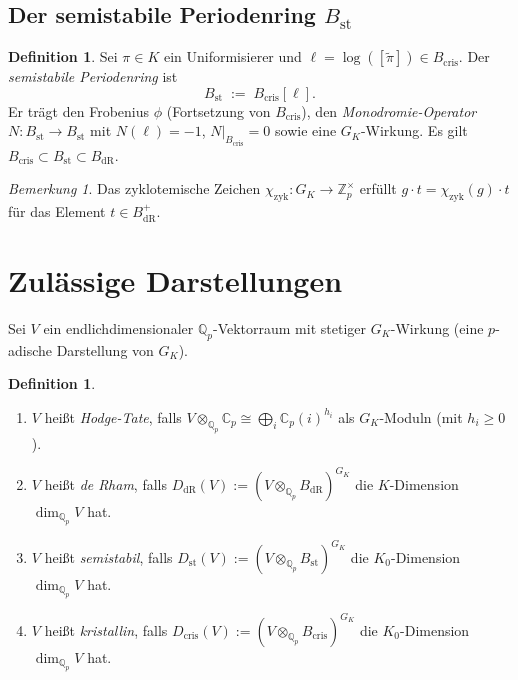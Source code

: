 \documentclass[12pt,a4paper]{amsart}
\theoremstyle{definition}
\newtheorem{definition_de}[theorem]{Definition}
\theoremstyle{remark}
\newtheorem{bemerkung}[theorem]{Bemerkung}
\newcommand{\Qp}{\mathbb{Q}_p}
\newcommand{\Zp}{\mathbb{Z}_p}
\newcommand{\BdR}{B_{\mathrm{dR}}}
\newcommand{\Bcris}{B_{\mathrm{cris}}}
\newcommand{\Bst}{B_{\mathrm{st}}}
\newcommand{\DdR}{D_{\mathrm{dR}}}
\newcommand{\Dcris}{D_{\mathrm{cris}}}
\newcommand{\Dst}{D_{\mathrm{st}}}
\begin{document}
\subsection{Der semistabile Periodenring $\Bst$}

\begin{definition_de}
  Sei $\pi \in K$ ein Uniformisierer und $\ell = \log([\widetilde{\pi}]) \in \Bcris$.
  Der \emph{semistabile Periodenring} ist
  \[
    \Bst \;:=\; \Bcris[\ell].
  \]
  Er trägt den Frobenius $\phi$ (Fortsetzung von $\Bcris$), den
  \emph{Monodromie-Operator} $N\colon \Bst \to \Bst$ mit $N(\ell) = -1$,
  $N|_{\Bcris} = 0$ sowie eine $G_K$-Wirkung.
  Es gilt $\Bcris \subset \Bst \subset \BdR$.
\end{definition_de}

\begin{bemerkung}
  Das zyklotemische Zeichen $\chi_{\mathrm{zyk}}\colon G_K \to \Zp^\times$ erfüllt
  $g \cdot t = \chi_{\mathrm{zyk}}(g) \cdot t$ für das Element $t \in \BdR^+$.
\end{bemerkung}

\section{Zulässige Darstellungen}\label{sec:darstellungen}

Sei $V$ ein endlichdimensionaler $\Qp$-Vektorraum mit stetiger $G_K$-Wirkung
(eine $p$-adische Darstellung von $G_K$).

\begin{definition_de}
  \begin{enumerate}[label=(\roman*)]
    \item $V$ heißt \emph{Hodge-Tate}, falls
      $V \otimes_{\Qp} \mathbb{C}_p \cong \bigoplus_i \mathbb{C}_p(i)^{h_i}$
      als $G_K$-Moduln (mit $h_i \geq 0$).
    \item $V$ heißt \emph{de Rham}, falls
      $\DdR(V) := (V \otimes_{\Qp} \BdR)^{G_K}$
      die $K$-Dimension $\dim_{\Qp} V$ hat.
    \item $V$ heißt \emph{semistabil}, falls
      $\Dst(V) := (V \otimes_{\Qp} \Bst)^{G_K}$
      die $K_0$-Dimension $\dim_{\Qp} V$ hat.
    \item $V$ heißt \emph{kristallin}, falls
      $\Dcris(V) := (V \otimes_{\Qp} \Bcris)^{G_K}$
      die $K_0$-Dimension $\dim_{\Qp} V$ hat.
  \end{enumerate}
\end{definition_de}
\end{document}
